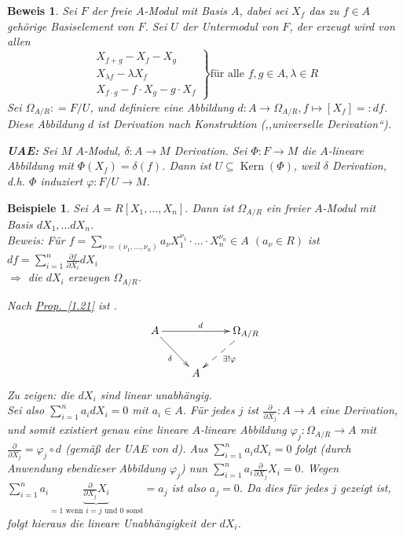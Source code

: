 \documentclass[a4paper,12pt]{scrbook}
\theoremstyle{break}
\theoremstyle{nonumberbreak}
\newtheorem{Bew}{Beweis}
\newtheorem{nnBsp}{Beispiele}
\theoremstyle{nonumberplain}
\newcommand{\defeqr}[0]{\mathrel{\mathop:}=}
\newcommand{\defeql}[0]{=\mathrel{\mathop:}}
\newcommand{\myref}[2]{%
\hyperref[#2]{#1~\ref*{#2}}%
}
\DeclareMathOperator{\Hom}{Hom}
\DeclareMathOperator{\Kern}{Kern}
\begin{document}
\begin{Bew}
  Sei $F$ der freie $A$-Modul mit Basis $A$, dabei sei $X_f$ das zu $f \in A$
  gehörige Basiselement von $F$.
  Sei $U$ der Untermodul von $F$, der erzeugt wird von allen
  \[\left. \begin{array}{l}
       X_{f+g} - X_f - X_g\\
       X_{\lambda f} - \lambda X_f\\
       X_{f \cdot g} - f \cdot X_g - g \cdot X_f
     \end{array} \right\} \text{für alle } f,g \in A, \lambda \in R\]
  Sei $\Omega_{A/R} \defeqr F/U$, und definiere eine Abbildung
  $d: A \to \Omega_{A/R}, f \mapsto [X_f] \defeql d f$. Diese Abbildung $d$
   ist Derivation nach Konstruktion (,,universelle Derivation``).

  \textbf{UAE:} Sei $M$ $A$-Modul, $\delta: A \to M$ Derivation. Sei $\Phi: F \to
  M$ die $A$-lineare Abbildung mit $\Phi(X_f) = \delta(f)$. Dann ist $U \subseteq
  \Kern(\Phi)$, weil $\delta$ Derivation, d.h. $\Phi$ induziert $\varphi:
  F/U \to M$.
\end{Bew}

\begin{nnBsp}
  Sei $A = R[X_1, \dots , X_n]$. Dann ist $\Omega_{A/R}$ ein freier $A$-Modul mit Basis
  $d X_1, \dots d X_n$.\\
  \textit{Beweis:} Für $f = \sum_{\nu = (\nu_1, \dots , \nu_n)} a_{\nu} X_1^{\nu_1} \cdot \dots \cdot X_n^{\nu_n} \in A$ $(a_{\nu} \in R)$ ist $d f = \sum_{i=1}^n \frac{\partial f}{\partial X_i} d X_i$\\
  $\Rightarrow$ die $d X_i$ erzeugen $\Omega_{A/R}$.

  Nach \myref{Prop.}{1.21} ist \fbox{$\mbox{Der}_R(A,A) = \Hom_A(\Omega_{A/R},A)$}.
  \[
    \begin{xy}
      \xymatrix{
         A \ar[rr]^{d} \ar[rd]_{\delta}  &     &  \Omega_{A/R} \ar@{-->}[dl]^{\exists!\varphi}  \\
                                         &  A  &
      }
    \end{xy}
  \]
  Zu zeigen: die $dX_i$ sind linear unabhängig.\\
  Sei also $\sum_{i = 1}^n a_i d X_i = 0$ mit $a_i \in A$. Für jedes $j$ ist
  $\frac{\partial}{\partial X_j} : A \to A$ eine Derivation, und somit existiert genau
  eine lineare $A$-lineare Abbildung $\varphi_j : \Omega_{A/R} \to A$ mit
  $\frac{\partial}{\partial X_j} = \varphi_j \circ d$ (gemäß der UAE von $d$).
  Aus $\sum_{i = 1}^n a_i d X_i = 0$ folgt (durch Anwendung ebendieser
  Abbildung $\varphi_j$) nun $\sum_{i = 1}^n a_i \frac{\partial}{\partial X_j} X_i = 0$.
  Wegen $\sum_{i = 1}^n a_i \underbrace{\frac{\partial}{\partial X_j} X_i}_{=1\mbox{ wenn }i=j\mbox{ und }0\mbox{ sonst}}
  = a_j$ ist also $a_j = 0$. Da dies für jedes $j$ gezeigt ist, folgt hieraus die
  lineare Unabhängigkeit der $dX_i$.
\end{nnBsp}
\end{document}
